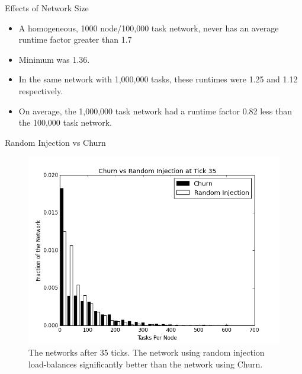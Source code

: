 \documentclass[11pt]{beamer}
\begin{document}
\begin{frame}{Effects of Network Size}
	\begin{itemize}
		\item A homogeneous, 1000 node/100,000 task network, never has an average runtime factor greater than 1.7
		\item Minimum was 1.36.
		\item In the same network with 1,000,000 tasks, these runtimes were 1.25 and 1.12 respectively.
		\item On average, the 1,000,000 task network had a runtime factor 0.82 less than the 100,000 task network.
	\end{itemize}
\end{frame}



\begin{frame}{Random Injection vs Churn}
\begin{figure}
	\centering
	\includegraphics[width=0.7\linewidth]{figs/churnInjectionHist35}
	\caption[Churn vs Random Injection after 35 ticks.]{The networks after 35 ticks.  The network using random injection load-balances significantly better than the network using Churn.}
	\label{fig:churnInjectionHist35}
\end{figure}

\end{frame}
\end{document}
